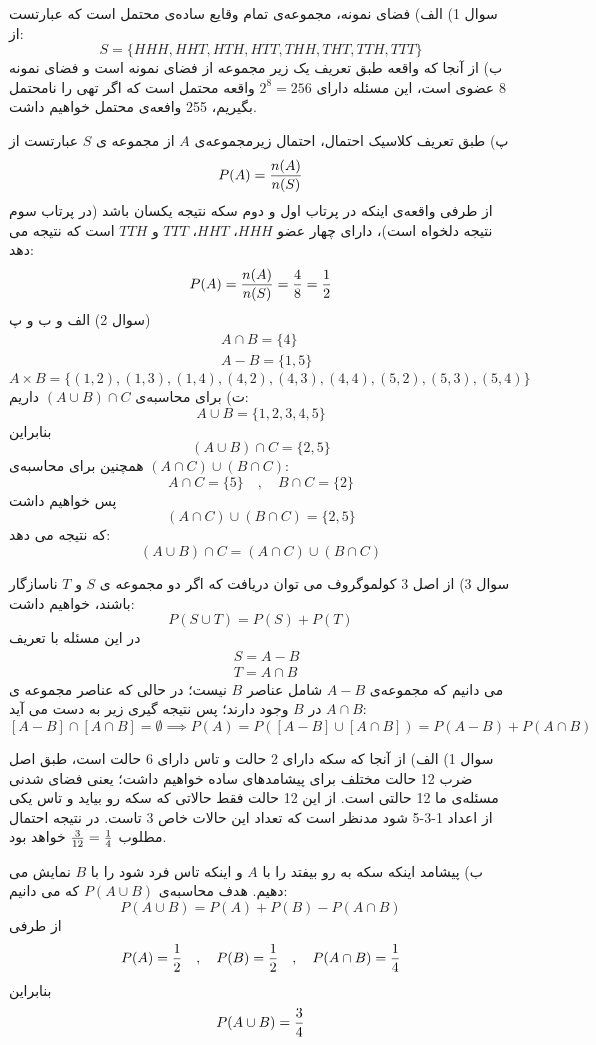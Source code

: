 \documentclass[10pt,letterpaper]{report}
\begin{document}

سوال 1) الف) فضای نمونه، مجموعه‌ی تمام وقایع ساده‌ی محتمل است که عبارتست از:
$$
S=\{HHH,HHT,HTH,HTT,THH,THT,TTH,TTT\}
$$
ب) از آنجا که واقعه طبق تعریف یک زیر مجموعه از فضای نمونه است و فضای نمونه 8 عضوی است، این مسئله دارای $2^8=256$ واقعه محتمل است که اگر تهی را نامحتمل بگیریم، 255 وافعه‌ی محتمل خواهیم داشت.

پ) طبق تعریف کلاسیک احتمال، احتمال زیرمجموعه‌ی $A$ از مجموعه ی $S$ عبارتست از
$$
P(A)={n(A)\over n(S)}
$$
از طرفی واقعه‌ی اینکه در پرتاب اول و دوم سکه نتیجه یکسان باشد (در پرتاب سوم نتیجه دلخواه است)، دارای چهار عضو $HHH$، $HHT$، $TTT$ و $TTH$ است که نتیجه می دهد:
$$
P(A)={n(A)\over n(S)}={4\over8}={1\over2}
$$
سوال 2) الف و ب و پ)
\[
\begin{split}
&A\cap B=\{4\}
\\&A-B=\{1,5\}
\end{split}
\]
$$
A\times B=\{(1,2),(1,3),(1,4),(4,2),(4,3),(4,4),(5,2),(5,3),(5,4)\}
$$
ت) برای محاسبه‌ی 
$
(A\cup B)\cap C
$
داریم:
$$
A\cup B=\{1,2,3,4,5\}
$$
بنابراین
$$
(A\cup B)\cap C=\{2,5\}
$$
همچنین برای محاسبه‌ی $(A\cap C)\cup (B\cap C)$:
$$
A\cap C=\{5\}\quad,\quad B\cap C=\{2\}
$$
پس خواهیم داشت
$$
(A\cap C)\cup(B\cap C)=\{2,5\}
$$
که نتیجه می دهد:
$$
(A\cup B)\cap C=(A\cap C)\cup (B\cap C)
$$

سوال 3) از اصل 3 کولموگروف می توان دریافت که اگر دو مجموعه ی $S$ و $T$ ناسازگار باشند، خواهیم داشت:
$$
P(S\cup T)=P(S)+P(T)
$$
در این مسئله با تعریف
\[
\begin{split}
&S=A-B
\\&T=A\cap B
\end{split}
\]
می دانیم که مجموعه‌ی $A-B$ شامل عناصر $B$ نیست؛ در حالی که عناصر مجموعه ی $A\cap B$ در $B$ وجود دارند؛ پس نتیجه گیری زیر به دست می آید:
$$
[A-B]\cap[A\cap B]=\emptyset\implies P(A)=P([A-B]\cup[A\cap B])=P(A-B)+P(A\cap B)
$$



سوال 1) الف) از آنجا که سکه دارای 2 حالت و تاس دارای 6 حالت است، طبق اصل ضرب 12 حالت مختلف برای پیشامدهای ساده خواهیم داشت؛ یعنی فضای شدنی مسئله‌ی ما 12 حالتی است. از این 12 حالت فقط حالاتی که سکه رو بیاید و تاس یکی از اعداد 1-3-5 شود مدنظر است که تعداد این حالات خاص 3 تاست. در نتیجه احتمال مطلوب 
$
{3\over 12}={1\over 4}
$
خواهد بود.

ب) پیشامد اینکه سکه به رو بیفتد را با $A$ و اینکه تاس فرد شود را با $B$ نمایش می دهیم. هدف محاسبه‌ی 
$
P(A\cup B)
$
 که می دانیم:
$$
P(A\cup B)=P(A)+P(B)-P(A\cap B)
$$
از طرفی
$$
P(A)={1\over 2}\quad,\quad P(B)={1\over 2}\quad,\quad P(A\cap B)={1\over 4}
$$
بنابراین
$$
P(A\cup B)={3\over 4}
$$
\end{document}
